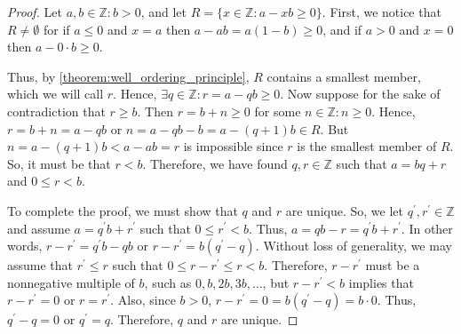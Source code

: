 \documentclass[12pt, titlepage]{amsart}
\newcommand\Z{{\mathbb Z}}
\theoremstyle{definition}
\begin{document}
	\begin{proof}
		Let $a, b \in \Z : b > 0$, and let $R = \{ x \in \Z : a - xb \geq 0 \}$. First, we notice that $R \neq \emptyset$ for if $a \leq 0$ and $x = a$ then $a - ab = a(1-b) \geq 0$, and if $a > 0$ and $x = 0$ then $a - 0 \cdot b \geq 0$. 
		
		Thus, by \cref{theorem:well_ordering_principle}, $R$ contains a smallest member, which we will call $r$. Hence, $\exists q \in \Z : r = a - qb \geq 0$. Now suppose for the sake of contradiction that $r \geq b$. 
		Then $r = b + n \geq 0$ for some $n \in \Z: n \geq 0$. Hence, $r = b + n = a - qb$ or $n = a - qb - b = a - (q + 1)b \in R$. But $n = a - (q + 1)b < a - ab = r$ is impossible since $r$ is the smallest member of $R$. So, it must be that $r < b$. Therefore, we have found $q, r \in \Z$ such that $ a = bq + r $ and $0 \leq r < b$.
		
		To complete the proof, we must show that $q$ and $r$ are unique. So, we let $q^\prime, r^\prime \in \Z$ and assume $a = q^\prime b + r^\prime$ such that $0 \leq r^\prime < b$. Thus, $a = qb - r = q^\prime b + r^\prime$. In other words,  $r - r^\prime = q^\prime b - qb $ or $r - r^\prime = b (q^\prime - q)$. Without loss of generality, we may assume that $r^\prime \leq r$ such that $0 \leq r - r^\prime \leq r < b$. Therefore, $r - r^\prime$ must be a nonnegative multiple of $b$, such as $0, b, 2b, 3b, \ldots$, but $r - r^\prime < b$ implies that $r - r^\prime = 0$ or $r = r^\prime$. Also, since $b > 0$, $r - r^\prime = 0 = b (q^\prime - q) = b \cdot 0$. Thus, $q^\prime - q = 0$ or $q^\prime = q$. Therefore, $q$ and $r$ are unique.
		
		
	\end{proof}
	
	
	
\end{document}
